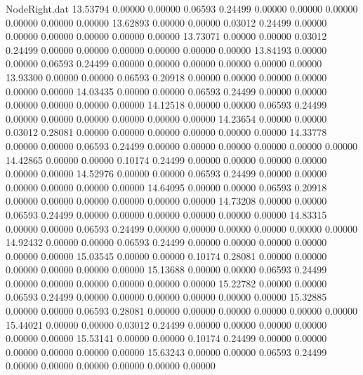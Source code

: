 \begin{filecontents}{NodeRight.dat}
  13.53794    0.00000    0.00000     0.06593    0.24499    0.00000    0.00000    0.00000    0.00000    0.00000    0.00000
  13.62893    0.00000    0.00000     0.03012    0.24499    0.00000    0.00000    0.00000    0.00000    0.00000    0.00000
  13.73071    0.00000    0.00000     0.03012    0.24499    0.00000    0.00000    0.00000    0.00000    0.00000    0.00000
  13.84193    0.00000    0.00000     0.06593    0.24499    0.00000    0.00000    0.00000    0.00000    0.00000    0.00000
  13.93300    0.00000    0.00000     0.06593    0.20918    0.00000    0.00000    0.00000    0.00000    0.00000    0.00000
  14.03435    0.00000    0.00000     0.06593    0.24499    0.00000    0.00000    0.00000    0.00000    0.00000    0.00000
  14.12518    0.00000    0.00000     0.06593    0.24499    0.00000    0.00000    0.00000    0.00000    0.00000    0.00000
  14.23654    0.00000    0.00000     0.03012    0.28081    0.00000    0.00000    0.00000    0.00000    0.00000    0.00000
  14.33778    0.00000    0.00000     0.06593    0.24499    0.00000    0.00000    0.00000    0.00000    0.00000    0.00000
  14.42865    0.00000    0.00000     0.10174    0.24499    0.00000    0.00000    0.00000    0.00000    0.00000    0.00000
  14.52976    0.00000    0.00000     0.06593    0.24499    0.00000    0.00000    0.00000    0.00000    0.00000    0.00000
  14.64095    0.00000    0.00000     0.06593    0.20918    0.00000    0.00000    0.00000    0.00000    0.00000    0.00000
  14.73208    0.00000    0.00000     0.06593    0.24499    0.00000    0.00000    0.00000    0.00000    0.00000    0.00000
  14.83315    0.00000    0.00000     0.06593    0.24499    0.00000    0.00000    0.00000    0.00000    0.00000    0.00000
  14.92432    0.00000    0.00000     0.06593    0.24499    0.00000    0.00000    0.00000    0.00000    0.00000    0.00000
  15.03545    0.00000    0.00000     0.10174    0.28081    0.00000    0.00000    0.00000    0.00000    0.00000    0.00000
  15.13688    0.00000    0.00000     0.06593    0.24499    0.00000    0.00000    0.00000    0.00000    0.00000    0.00000
  15.22782    0.00000    0.00000     0.06593    0.24499    0.00000    0.00000    0.00000    0.00000    0.00000    0.00000
  15.32885    0.00000    0.00000     0.06593    0.28081    0.00000    0.00000    0.00000    0.00000    0.00000    0.00000
  15.44021    0.00000    0.00000     0.03012    0.24499    0.00000    0.00000    0.00000    0.00000    0.00000    0.00000
  15.53141    0.00000    0.00000     0.10174    0.24499    0.00000    0.00000    0.00000    0.00000    0.00000    0.00000
  15.63243    0.00000    0.00000     0.06593    0.24499    0.00000    0.00000    0.00000    0.00000    0.00000    0.00000

\end{filecontents}
